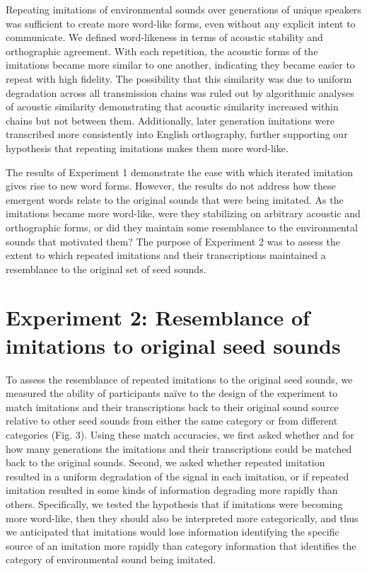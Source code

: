 \documentclass[english,floatsintext,man]{apa6}
\theoremstyle{definition}
\theoremstyle{definition}
\theoremstyle{definition}
\theoremstyle{remark}
\begin{document}
Repeating imitations of environmental sounds over generations of unique
speakers was sufficient to create more word-like forms, even without any
explicit intent to communicate. We defined word-likeness in terms of
acoustic stability and orthographic agreement. With each repetition, the
acoustic forms of the imitations became more similar to one another,
indicating they became easier to repeat with high fidelity. The
possibility that this similarity was due to uniform degradation across
all transmission chains was ruled out by algorithmic analyses of
acoustic similarity demonstrating that acoustic similarity increased
within chains but not between them. Additionally, later generation
imitations were transcribed more consistently into English orthography,
further supporting our hypothesis that repeating imitations makes them
more word-like.

The results of Experiment 1 demonstrate the ease with which iterated
imitation gives rise to new word forms. However, the results do not
address how these emergent words relate to the original sounds that were
being imitated. As the imitations became more word-like, were they
stabilizing on arbitrary acoustic and orthographic forms, or did they
maintain some resemblance to the environmental sounds that motivated
them? The purpose of Experiment 2 was to assess the extent to which
repeated imitations and their transcriptions maintained a resemblance to
the original set of seed sounds.

\hypertarget{experiment-2-resemblance-of-imitations-to-original-seed-sounds}{%
\section{Experiment 2: Resemblance of imitations to original seed
sounds}\label{experiment-2-resemblance-of-imitations-to-original-seed-sounds}}

To assess the resemblance of repeated imitations to the original seed
sounds, we measured the ability of participants naïve to the design of
the experiment to match imitations and their transcriptions back to
their original sound source relative to other seed sounds from either
the same category or from different categories (Fig. 3). Using these
match accuracies, we first asked whether and for how many generations
the imitations and their transcriptions could be matched back to the
original sounds. Second, we asked whether repeated imitation resulted in
a uniform degradation of the signal in each imitation, or if repeated
imitation resulted in some kinds of information degrading more rapidly
than others. Specifically, we tested the hypothesis that if imitations
were becoming more word-like, then they should also be interpreted more
categorically, and thus we anticipated that imitations would lose
information identifying the specific source of an imitation more rapidly
than category information that identifies the category of environmental
sound being imitated.
\end{document}
